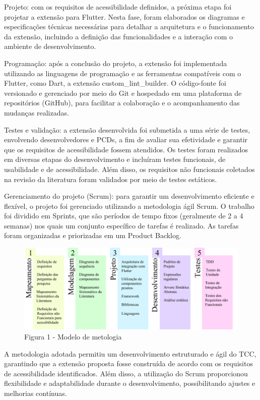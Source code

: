 Projeto: com os requisitos de acessibilidade definidos, a próxima etapa foi projetar a extensão para Flutter. Nesta fase, foram elaborados os diagramas e especificações técnicas necessárias para detalhar a arquitetura e o funcionamento da extensão, incluindo a definição das funcionalidades e a interação com o ambiente de desenvolvimento.

Programação: após a conclusão do projeto, a extensão foi implementada utilizando as linguagens de programação e as ferramentas compatíveis com o Flutter, como Dart, a extensão custom\_lint\_builder. O código-fonte foi versionado e gerenciado por meio do Git e hospedado em uma plataforma de repositórios (GitHub), para facilitar a colaboração e o acompanhamento das mudanças realizadas.

Testes e validação: a extensão desenvolvida foi submetida a uma série de testes, envolvendo desenvolvedores e PCDs, a fim de avaliar sua efetividade e garantir que os requisitos de acessibilidade fossem atendidos. Os testes foram realizados em diversas etapas do desenvolvimento e incluíram testes funcionais, de usabilidade e de acessibilidade. Além disso, os requisitos não funcionais coletados na revisão da literatura foram validados por meio de testes estáticos.

Gerenciamento do projeto (Scrum): para garantir um desenvolvimento eficiente e flexível, o projeto foi gerenciado utilizando a metodologia ágil Scrum. O trabalho foi dividido em Sprints, que são períodos de tempo fixos (geralmente de 2 a 4 semanas) nos quais um conjunto específico de tarefas é realizado. As tarefas foram organizadas e priorizadas em um Product Backlog.

\begin{figure}[!h]
	\centering
	\caption{Figura 1 - Modelo de metologia}
	\includegraphics[scale=1]{Assets/Modelo de metodologia.png}
\end{figure}

A metodologia adotada permitiu um desenvolvimento estruturado e ágil do TCC, garantindo que a extensão proposta fosse construída de acordo com os requisitos de acessibilidade identificados. Além disso, a utilização do Scrum proporcionou flexibilidade e adaptabilidade durante o desenvolvimento, possibilitando ajustes e melhorias contínuas.

